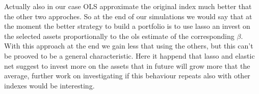 \documentclass{article}%
\begin{document}
Actually also in our case OLS approximate the original index much better that the other two approches. So at the end of our simulations we would say that at the moment the better strategy to build a portfolio is to use lasso an invest on the selected assets proportionally to the ols estimate of the corresponding $\beta$. 
With this approach at the end we gain less that using the others, but this can't be prooved to be a general characteristic. Here it happend that lasso and elastic net suggest to invest more on the assets that in future will grow more that the average, further work on investigating if this behaviour repeats also with other indexes would be interesting.
\end{document}

